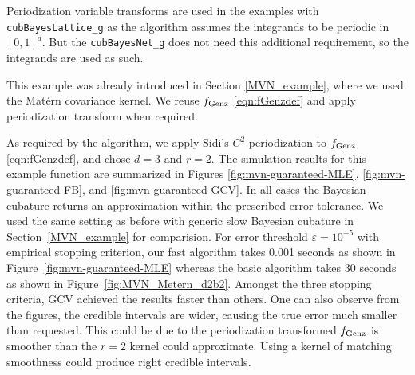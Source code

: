 \documentclass{iitthesis}          %
\newcommand{\hmu}{\widehat{\mu}}
\newcommand{\code}[1]{\texttt{#1}}
\def\abs#1{\ensuremath{\left \lvert #1 \right \rvert}}
\newcommand\figref{Figure~\ref}
\newcommand\secref{Section~\ref}
\begin{document}
Periodization variable transforms are used in the examples with \allowbreak \code{cubBayesLattice\_g} as the algorithm assumes the integrands to be periodic in $[0,1]^d$. But the \allowbreak \code{cubBayesNet\_g} does not need this additional requirement, so the integrands are used as such.




This example was already introduced in Section \ref{MVN_example}, where we used the Mat\'ern covariance kernel.  We reuse $ f_{\textup{Genz}}$ \eqref{eqn:fGenzdef} and apply periodization transform when required.

\Subsection{Using \code{cubBayesLattice\_g}}
As required by the algorithm, we apply Sidi's $C^2$  periodization to $ f_{\textup{Genz}}$ \eqref{eqn:fGenzdef}, and chose $d=3$ and $r=2$. The simulation results for this example function are summarized in Figures \ref{fig:mvn-guaranteed-MLE}, \ref{fig:mvn-guaranteed-FB}, and \ref{fig:mvn-guaranteed-GCV}.  In all cases the Bayesian cubature returns an approximation within the prescribed error tolerance. We used the same setting as before with generic slow Bayesian cubature in \secref{MVN_example} for comparision. For error threshold $\varepsilon=10^{-5}$ with empirical stopping criterion, our fast algorithm takes 0.001 seconds as shown in \figref{fig:mvn-guaranteed-MLE} whereas the basic algorithm takes 30 seconds as shown in \figref{fig:MVN_Metern_d2b2}. 
Amongst the three stopping criteria, GCV achieved the results faster than others. 
One can also observe from the figures, the credible intervals are wider, causing the true error much smaller than requested.
This could be due to the periodization transformed $f_\textup{Genz}$ is smoother than the $r=2$ kernel could approximate. Using a kernel of matching smoothness could produce right credible intervals.
\end{document}
